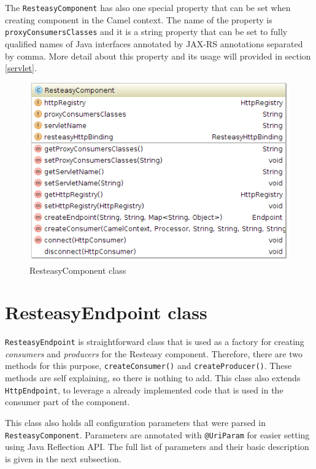 \documentclass[12pt,final,oneside]{fithesis2}
\begin{document}
The \texttt{ResteasyComponent} has also one special property that can be set when creating component in the Camel context. The name of the property is \texttt{proxyConsumersClasses} and it is a string property that can be set to fully qualified names of Java interfaces annotated by JAX-RS annotations separated by comma. More detail about this property and its usage will provided in section \ref{servlet}.

\begin{figure}[h]
\centering
\includegraphics[width=0.8\linewidth]{images/component.png}
\caption{ResteasyComponent class}
\label{comp}
\end{figure}

\section{ResteasyEndpoint class}
\texttt{ResteasyEndpoint}  is straightforward class that is used as a factory for creating \textit{consumers} and \textit{producers} for the Resteasy component. Therefore, there are two methods for this purpose, \texttt{createConsumer()} and \texttt{createProducer()}. These methods are self explaining, so there is nothing to add. This class also extends \texttt{HttpEndpoint}, to leverage a already implemented code that is used in the consumer part of the component.

This class also holds all configuration parameters that were parsed in \texttt{ResteasyComponent}. Parameters are annotated with \texttt{@UriParam} for easier setting using Java Reflection API. The full list of parameters and their basic description is given in the next subsection.
\end{document}
